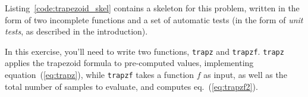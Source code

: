 Listing~\ref{code:trapezoid_skel} contains a skeleton for this problem,
written in the form of two incomplete functions and a set of automatic
tests (in the form of \emph{unit tests}, as described in the introduction).



In this exercise, you'll need to write two functions, \texttt{trapz}
and \texttt{trapzf}. \texttt{trapz} applies the trapezoid formula
to pre-computed values, implementing equation~(\ref{eq:trapz}),
while \texttt{trapzf} takes a function $f$ as input, as well as the
total number of samples to evaluate, and computes eq.~(\ref{eq:trapzf2}).

